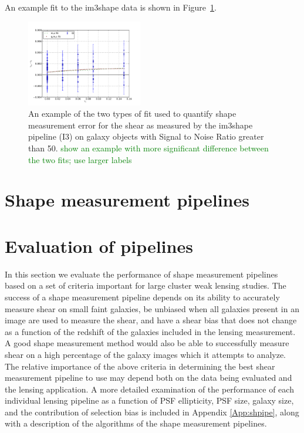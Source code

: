 \documentclass[useAMS,usenatbib]{mn2e}
\newcommand{\green}[1]{\textcolor{green}{#1}}
\begin{document}
An example fit to the im3shape data is shown in Figure~\ref{fig:eqfit}.

\begin{figure}
 \centering  %
  \includegraphics[width=0.45\textwidth]{fig/fitplt.pdf} 
  \caption{An example of the two types of fit used to quantify shape
    measurement error for the shear as measured by the im3shape
    pipeline (I3) on galaxy objects with Signal
    to Noise Ratio greater than 50. \green{show an example with more significant difference between the two fits; use larger labels} }
\label{fig:eqfit}
\end{figure}




\section{Shape measurement pipelines}




\section{Evaluation of pipelines}
In this section we evaluate the performance of shape measurement 
pipelines based on a set of criteria important for large cluster weak
lensing studies. The success of a shape measurement pipeline depends
on its ability to accurately measure shear on small faint galaxies, be unbiased
when all galaxies present in an image are used to measure the shear, and
have a shear bias that does not change as a function of the redshift
of the galaxies included in the lensing measurement. A good shape
measurement method would also be able to successfully measure shear on
a high percentage of the galaxy images which it attempts to analyze. 
The relative importance of the above criteria in determining
the best shear measurement pipeline to use may depend both on the 
data being evaluated and the lensing application. A more detailed examination
of the performance of each individual lensing pipeline 
as a function of PSF ellipticity, PSF size, galaxy size, 
and the contribution of selection bias is included in Appendix \ref{App:shpipe}, along
with a description of the algorithms of the shape measurement pipelines. \\
\end{document}
